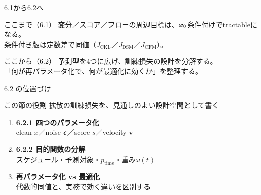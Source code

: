 

\begin{frame}{6.1から6.2へ}
    \begin{block}{ここまで（6.1）}
        変分／スコア／フローの周辺目標は、$\bm{x}_0$条件付けでtractableになる。\\
        条件付き版は定数差で同値（$J_{\mathrm{CKL}}$／$J_{\mathrm{DSM}}$／$J_{\mathrm{CFM}}$）。
    \end{block}
    \begin{block}{ここから（6.2）}
        予測型を4つに広げ、訓練損失の設計を分解する。\\
        「何が再パラメータ化で、何が最適化に効くか」を整理する。
    \end{block}
\end{frame}
\asmain
\begin{frame}{6.2 の位置づけ}
    \begin{block}{この節の役割}
        拡散の訓練損失を、見通しのよい設計空間として書く
    \end{block}
    \begin{enumerate}
        \item \textbf{6.2.1 四つのパラメータ化}\\
        clean $x$／noise $\bm{\epsilon}$／score $s$／velocity $\bm{v}$
        \item \textbf{6.2.2 目的関数の分解}\\
        スケジュール・予測対象・$p_{\mathrm{time}}$・重み$\omega(t)$
        \item \textbf{再パラメータ化 vs 最適化}\\
        代数的同値と、実務で効く違いを区別する
    \end{enumerate}
\end{frame}
